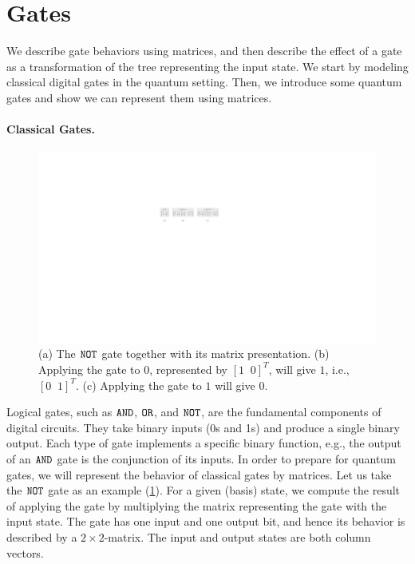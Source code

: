 \section{Gates} 
We describe gate behaviors using matrices, and then describe the effect of a gate as a transformation of the tree representing the input state.
%
We start by modeling classical digital gates in the quantum setting.
%
Then, we introduce some quantum gates and show we can represent them using matrices.

\paragraph{Classical Gates.}
\begin{figure} 
\includegraphics[]{Figures/Gates/not} 
\caption{(a) The $\mathtt{NOT}$ gate together with its matrix presentation.
(b) Applying the gate to $0$, represented by $[1\;\;0]^T$, will give $1$, i.e., $[0\;\;1]^T$.
(c) Applying the gate to $1$ will give $0$.}
\label{not:gate:fig}
\end{figure}
%
Logical gates, such as $\mathtt{AND}$, $\mathtt{OR}$, and $\mathtt{NOT}$, are the fundamental components of digital circuits. 
%
They take binary inputs (0s and 1s) and produce a single binary output.
%
Each type of gate implements a specific binary function, e.g., the output of an $\mathtt{AND}$ gate is the conjunction of its inputs.
%
In order to prepare for quantum gates, we will represent the behavior of classical gates by matrices.
%
Let us take the $\mathtt{NOT}$ gate as an example (\cref{not:gate:fig}).
%
For a given (basis) state, we compute the result of applying the gate by multiplying the matrix representing the gate with the input state.
%
%
The gate has one input and one output bit, and hence its behavior is described by a $2\times2$-matrix.
%
The input and output states are both column vectors.

